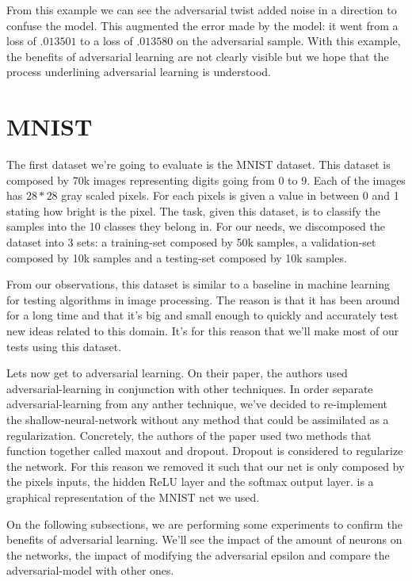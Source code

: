 		From this example we can see the adversarial twist added noise in a direction to confuse the model. This augmented the error made by the model: it went from a loss of $.013501$ to a loss of $.013580$ on the adversarial sample.
		With this example, the benefits of adversarial learning are not clearly visible but we hope that the process underlining adversarial learning is understood.



	\section{MNIST}
	\label{sub:MNIST}
		
		The first dataset we're going to evaluate is the MNIST dataset\cite{lecun-mnist}. This dataset is composed by 70k images representing digits going from 0 to 9. Each of the images has $28*28$ gray scaled pixels. For each pixels is given a value in between 0 and 1 stating how bright is the pixel. The task, given this dataset, is to classify the samples into the 10 classes they belong in. For our needs, we discomposed the dataset into 3 sets: a training-set composed by 50k samples, a validation-set composed by 10k samples and a testing-set composed by 10k samples. 

		From our observations, this dataset is similar to a baseline in machine learning for testing algorithms in image processing. The reason is that it has been around for a long time and that it's big and small enough to quickly and accurately test new ideas related to this domain. It's for this reason that we'll make most of our tests using this dataset.

		Lets now get to adversarial learning. On their paper\cite{goodfellow2014explaining}, the authors used adversarial-learning in conjunction with other techniques. In order separate adversarial-learning from any anther technique, we've decided to re-implement the shallow-neural-network without any method that could be assimilated as a regularization. Concretely, the authors of the paper used two methods that function together called maxout and dropout. Dropout is considered to regularize the network. For this reason we removed it such that our net is only composed by the pixels inputs, the hidden ReLU layer and the softmax output layer.  is a graphical representation of the MNIST net we used.

		On the following subsections, we are performing some experiments to confirm the benefits of adversarial learning. We'll see the impact of the amount of neurons on the networks, the impact of modifying the adversarial epsilon and compare the adversarial-model with other ones.

